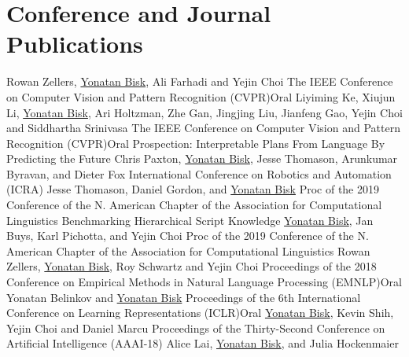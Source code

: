 \documentclass[10pt,letter]{moderncv}
\newcommand{\YB}{\underline{Yonatan Bisk}}
\begin{document}
\section{Conference and Journal Publications}
  {\href{http://visualcommonsense.com/}{\color{linkcolor}{From Recognition to Cognition: Visual Commonsense Reasoning}}}
  {Rowan Zellers, \YB{}, Ali Farhadi and Yejin Choi}
  {The IEEE Conference on Computer Vision and Pattern Recognition (CVPR)}{Oral}{}
\pub{--}
  {\href{https://arxiv.org/abs/1903.02547}{\color{linkcolor}{Tactical Rewind: Self-Correction via Backtracking in Vision-and-Language Navigation}}}
  {Liyiming Ke, Xiujun Li, \YB{}, Ari Holtzman, Zhe Gan, Jingjing Liu, Jianfeng Gao, Yejin Choi and Siddhartha Srinivasa}
  {The IEEE Conference on Computer Vision and Pattern Recognition (CVPR)}{Oral}{}
\pub{--}
  {Prospection: Interpretable Plans From Language By Predicting the Future}
  {Chris Paxton, \YB{}, Jesse Thomason, Arunkumar Byravan, and Dieter Fox}
  {International Conference on Robotics and Automation (ICRA)}{}{}
\pub{--}
  {\href{https://arxiv.org/abs/1811.00613}{\color{linkcolor}{Shifting the Baseline: Single Modality Performance on Visual Navigation \& QA}}}
  {Jesse Thomason, Daniel Gordon, and \YB{}}
  {Proc of the 2019 Conference of the N. American Chapter of the Association for Computational Linguistics}{}{}
\pub{--}
  {Benchmarking Hierarchical Script Knowledge}
  {\YB{}, Jan Buys, Karl Pichotta, and Yejin Choi}
  {Proc of the 2019 Conference of the N. American Chapter of the Association for Computational Linguistics}{}{}
  {\href{http://rowanzellers.com/swag/}{\color{linkcolor}{SWAG: A Large-Scale Adversarial Dataset for Grounded Commonsense Inference}}}
  {Rowan Zellers, \YB{}, Roy Schwartz and Yejin Choi}
  {Proceedings of the 2018 Conference on Empirical Methods in Natural Language Processing (EMNLP)}{Oral}{}
\pub{--}
  {\href{https://arxiv.org/abs/1711.02173}{\color{linkcolor}{Synthetic and Natural Noise Both Break Neural Machine Translation}}}
  {Yonatan Belinkov and \YB{}}
  {Proceedings of the 6th International Conference on Learning Representations (ICLR)}{Oral}{}
\pub{--}
  {\href{http://yonatanbisk.com/papers/2018-AAAI.pdf}{\color{linkcolor}{Learning Interpretable Spatial Operations in a Rich 3D Blocks World}}}
  {\YB{}, Kevin Shih, Yejin Choi and Daniel Marcu}
  {Proceedings of the Thirty-Second Conference on Artificial Intelligence (AAAI-18) }{}{}
  {\href{https://arxiv.org/abs/1710.02925}{\color{linkcolor}{Natural Language Inference from Multiple Premises}}}
  {Alice Lai, \YB{}, and Julia Hockenmaier}
\end{document}
